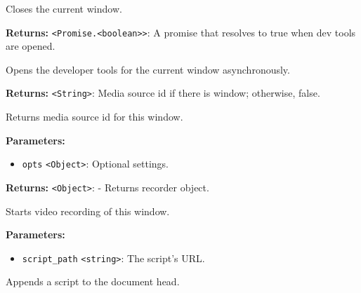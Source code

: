 \documentclass[12pt,a4paper]{article}
\begin{document}
\noindent Closes the current window.

\vspace{5mm}
\noindent {}


\noindent \textbf{Returns:} \texttt{<Promise.<boolean>>}: A promise that resolves to true when dev tools are opened.

\noindent Opens the developer tools for the current window asynchronously.

\vspace{5mm}
\noindent {}


\noindent \textbf{Returns:} \texttt{<String>}: Media source id if there is window; otherwise, false.

\noindent Returns media source id for this window.

\vspace{5mm}
\noindent {}


\noindent \textbf{Parameters:}
\begin{itemize}
  \item \texttt{opts} \texttt{<Object>}: Optional settings.
\end{itemize}

\noindent \textbf{Returns:} \texttt{<Object>}: - Returns recorder object.

\noindent Starts video recording of this window.

\vspace{5mm}
\noindent {}


\noindent \textbf{Parameters:}
\begin{itemize}
  \item \texttt{script\_path} \texttt{<string>}: The script's URL.
\end{itemize}

\noindent Appends a script to the document head.

\vspace{5mm}
\noindent {}
\end{document}
